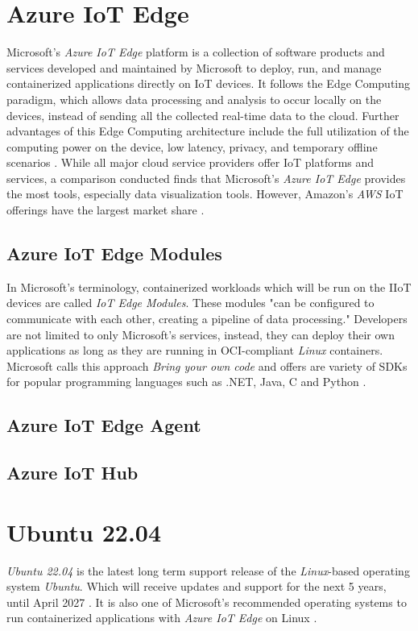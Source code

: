 \section{Azure IoT Edge}
Microsoft's \textit{Azure IoT Edge} platform is a collection of software products and services developed and
maintained by Microsoft to deploy, run, and manage containerized applications directly on
\ac{IoT} devices. It follows the Edge Computing paradigm,
which allows data processing and analysis to occur locally on the devices,
instead of sending all the collected real-time data to the cloud. Further advantages of this Edge Computing
architecture include the full utilization of the computing power on the device, low latency,
privacy, and temporary offline scenarios \cite{msdoc-aziotedge}. While all major cloud service providers
offer \ac{IoT} platforms and services, a comparison conducted finds that Microsoft's \textit{Azure IoT Edge} provides the most tools,
especially data visualization tools. However,
Amazon's \textit{AWS} \ac{IoT} offerings have the largest market
share \cite{9116254}.

\subsection{Azure IoT Edge Modules}
In Microsoft's terminology, containerized workloads which will be run on the \ac{IIoT}
devices are called \textit{IoT Edge Modules}. These modules "can be configured to
communicate with each other, creating a pipeline of data processing." Developers are
not limited to only Microsoft's services, instead, they can deploy their own
applications as long as they are running in \ac{OCI}-compliant \textit{Linux} containers.
Microsoft calls this approach \textit{Bring your own code} and offers are variety of
\ac{SDK}s for popular programming languages such as .NET, Java, C and Python \cite{msdoc-supportetplatforms}.

\subsection{Azure IoT Edge Agent}
\subsection{Azure IoT Hub}


\section{Ubuntu 22.04}
\textit{Ubuntu 22.04} is the latest long term support release of the \textit{Linux}-based operating system \textit{Ubuntu}. Which will receive updates and support
for the next 5 years, until April 2027 \cite{ubuntu-releasenote}. It is also one of
Microsoft's recommended operating systems to run containerized applications with
\textit{Azure IoT Edge} on Linux \cite{msdoc-supportetplatforms}.

